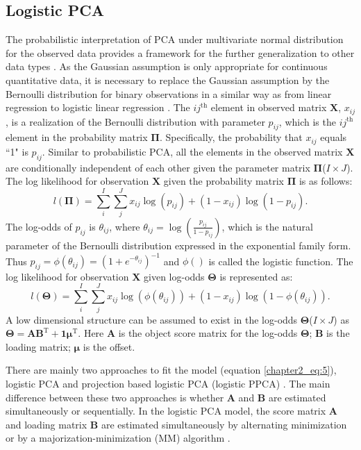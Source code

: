 \subsection{Logistic PCA}
The probabilistic interpretation of PCA under multivariate normal distribution for the observed data provides a framework for the further generalization to other data types \cite{tipping1999probabilistic}. As the Gaussian assumption is only appropriate for continuous quantitative data, it is necessary to replace the Gaussian assumption by the Bernoulli distribution for binary observations in a similar way as from linear regression to logistic linear regression \cite{collins2001generalization, landgraf2015generalized, de2006principal}. The $ij^{\text{th}}$ element in observed matrix $\mathbf{X}$, $x_{ij}$, is a realization of the Bernoulli distribution with parameter $p_{ij}$, which is the $ij^{\text{th}}$ element in the probability matrix $\mathbf{\Pi}$. Specifically, the probability that $x_{ij}$ equals ``1" is $p_{ij}$. Similar to probabilistic PCA, all the elements in the observed matrix $\mathbf{X}$ are conditionally independent of each other given the parameter matrix $\mathbf{\Pi}$($I\times J$). The log likelihood for observation $\mathbf{X}$ given the probability matrix $\mathbf{\Pi}$ is as follows:
\begin{equation}\label{chapter2_eq:4}
l(\mathbf{\Pi}) = \sum_{i}^{I}\sum_{j}^{J}x_{ij}\log(p_{ij})+(1-x_{ij})\log(1-p_{ij}).
\end{equation}
The log-odds of $p_{ij}$ is $\theta_{ij}$, where $\theta_{ij} = \log(\frac{p_{ij}}{1-p_{ij}})$, which is the natural parameter of the Bernoulli distribution expressed in the exponential family form. Thus $p_{ij} = \phi(\theta_{ij}) = (1+ e^{-\theta_{ij}})^{-1}$ and $\phi()$ is called the logistic function. The log likelihood for observation $\mathbf{X}$ given log-odds $\mathbf{ \Theta }$ is represented as:
\begin{equation}\label{chapter2_eq:5}
l(\mathbf{\Theta}) = \sum_{i}^{I}\sum_{j}^{J}x_{ij}\log(\phi(\theta_{ij}))+(1-x_{ij})\log(1-\phi(\theta_{ij})).
\end{equation}
A low dimensional structure can be assumed to exist in the log-odds $\mathbf{\Theta}$($I\times J$) as $\mathbf{\Theta} = \mathbf{A}\mathbf{B}^{\text{T}} + \mathbf{1}\bm{\mu}^{\text{T}}$. Here $\mathbf{A}$ is the object score matrix for the log-odds $\mathbf{ \Theta}$; $\mathbf{B}$ is the loading matrix; $\bm{\mu}$ is the offset.

There are mainly two approaches to fit the model (equation \ref{chapter2_eq:5}), logistic PCA \cite{de2006principal} and projection based logistic PCA (logistic PPCA) \cite{landgraf2015generalized}. The main difference between these two approaches is whether $\mathbf{A}$ and $\mathbf{B}$ are estimated  simultaneously or sequentially. In the logistic PCA model, the score matrix $\mathbf{A}$ and loading matrix $\mathbf{B}$ are estimated simultaneously by alternating minimization \cite{collins2001generalization, udell2016generalized} or by a majorization-minimization (MM) algorithm \cite{de2006principal}.

